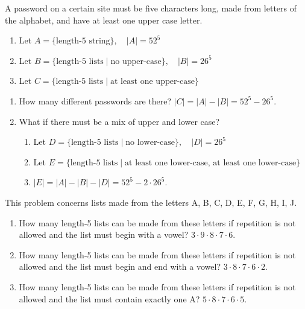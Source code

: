 \documentclass[openany, 12pt]{book}
\begin{document}
\begin{exercise}{}{}
	A password on a certain site must be five characters long,
	made from letters of the alphabet, and have at least one upper case letter.
	\begin{enumerate}[label={}, leftmargin=*, itemsep=0pt, parsep=0pt]
		\item Let $A=\{\text{length-5 string}\},\quad |A| = 52^5$
		\item Let $B=\{\text{length-5 lists}\mid\text{no upper-case}\}, \quad |B| = 26^5$
		\item Let $C=\{\text{length-5 lists}\mid\text{at least one upper-case}\}$
	\end{enumerate}
	\begin{enumerate}[label = {(\arabic*)}]
		\item How many different passwords are there?
		      $|C| = |A| - |B| = 52^5 - 26^5.$
		\item What if there must be a mix of upper and lower case?
		      \begin{enumerate}[label={}, leftmargin=*, itemsep=0pt, parsep=0pt]
			      \item Let $D=\{\text{length-5 lists}\mid\text{no lower-case}\}, \quad |D| = 26^5$
			      \item Let $E=\{\text{length-5 lists}\mid\text{at least one lower-case, at least one lower-case}\}$
			      \item $|E| = |A| - |B| - |D| = 52^5 - 2\cdot26^5.$
		      \end{enumerate}
	\end{enumerate}
\end{exercise}

\begin{exercise}{}{}
	This problem concerns lists made from the letters A, B, C, D, E, F, G, H, I, J.
	\begin{enumerate}[label = {(\arabic*)}]
		\item How many length-5 lists can be made from these letters if
		      repetition is not allowed and the list must begin with a vowel? $3
			      \cdot 9 \cdot 8 \cdot 7 \cdot 6$.
		\item How many length-5 lists can be made from these letters if
		      repetition is not allowed and the list must begin and end with a
		      vowel? $3 \cdot 8 \cdot 7 \cdot 6 \cdot 2$.
		\item How many length-5 lists can be made from these letters if
		      repetition is not allowed and the list must contain exactly one A?
		      $5 \cdot 8 \cdot 7 \cdot 6 \cdot 5$.
	\end{enumerate}
\end{exercise}
\end{document}
